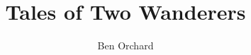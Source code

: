 



\title{Tales of Two Wanderers}
\author{Ben Orchard}


\frontmatter

\maketitle
\tableofcontents

\mainmatter



